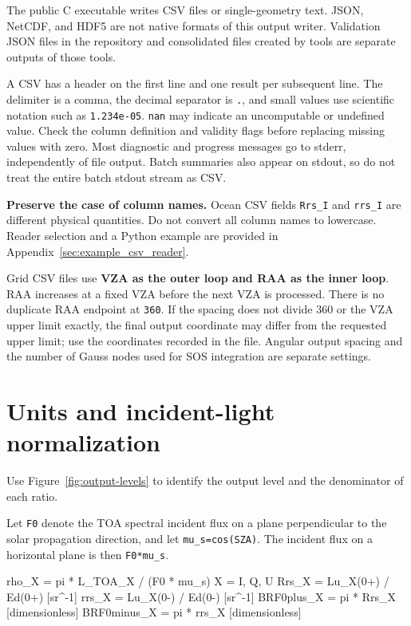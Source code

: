 The public C executable writes CSV files or single-geometry text. JSON, NetCDF, and HDF5 are not native formats of this output writer. Validation JSON files in the repository and consolidated files created by tools are separate outputs of those tools.

A CSV has a header on the first line and one result per subsequent line. The delimiter is a comma, the decimal separator is \texttt{.\allowbreak{}}, and small values use scientific notation such as \texttt{1.\allowbreak{}234e-\allowbreak{}05}. \texttt{nan} may indicate an uncomputable or undefined value. Check the column definition and validity flags before replacing missing values with zero. Most diagnostic and progress messages go to stderr, independently of file output. Batch summaries also appear on stdout, so do not treat the entire batch stdout stream as CSV.

\textbf{Preserve the case of column names.} Ocean CSV fields \texttt{Rrs\_\allowbreak{}I} and \texttt{rrs\_\allowbreak{}I} are different physical quantities. Do not convert all column names to lowercase. Reader selection and a Python example are provided in Appendix~\ref{sec:example_csv_reader}.

Grid CSV files use \textbf{VZA as the outer loop and RAA as the inner loop}. RAA increases at a fixed VZA before the next VZA is processed. There is no duplicate RAA endpoint at \texttt{360\textdegree{}}. If the spacing does not divide 360 or the VZA upper limit exactly, the final output coordinate may differ from the requested upper limit; use the coordinates recorded in the file. Angular output spacing and the number of Gauss nodes used for SOS integration are separate settings.

\Needspace{0.60\textheight}
\section{Units and incident-light normalization}
\label{sec:auto:05_output_formats:2}
Use Figure~\ref{fig:output-levels} to identify the output level and the denominator of each ratio.

\FloatBarrier
Let \texttt{F0} denote the TOA spectral incident flux on a plane perpendicular to the solar propagation direction, and let \texttt{mu\_\allowbreak{}s=\allowbreak{}cos(SZA)}. The incident flux on a horizontal plane is then \texttt{F0*mu\_\allowbreak{}s}.


\begin{ManualCode}
rho_X = pi * L_TOA_X / (F0 * mu_s)          X = I, Q, U
Rrs_X = Lu_X(0+) / Ed(0+)                  [sr^-1]
rrs_X = Lu_X(0-) / Ed(0-)                  [sr^-1]
BRF0plus_X  = pi * Rrs_X                   [dimensionless]
BRF0minus_X = pi * rrs_X                   [dimensionless]
\end{ManualCode}

